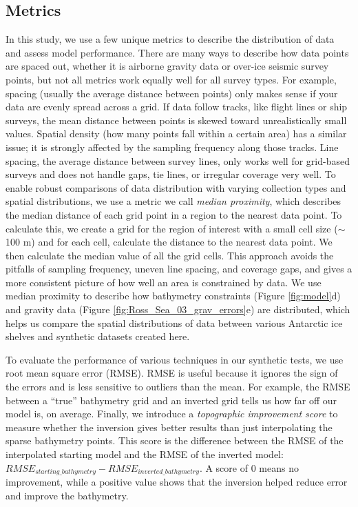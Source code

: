 \documentclass[tc, manuscript]{copernicus}
\begin{document}
\subsection{Metrics}
In this study, we use a few unique metrics to describe the distribution of data and assess model performance. There are many ways to describe how data points are spaced out, whether it is airborne gravity data or over-ice seismic survey points, but not all metrics work equally well for all survey types. For example, spacing (usually the average distance between points) only makes sense if your data are evenly spread across a grid. If data follow tracks, like flight lines or ship surveys, the mean distance between points is skewed toward unrealistically small values. Spatial density (how many points fall within a certain area) has a similar issue; it is strongly affected by the sampling frequency along those tracks. Line spacing, the average distance between survey lines, only works well for grid-based surveys and does not handle gaps, tie lines, or irregular coverage very well. To enable robust comparisons of data distribution with varying collection types and spatial distributions, we use a metric we call \textit{median proximity}, which describes the median distance of each grid point in a region to the nearest data point. To calculate this, we create a grid for the region of interest with a small cell size ($\sim$100 m) and for each cell, calculate the distance to the nearest data point. We then calculate the median value of all the grid cells.
This approach avoids the pitfalls of sampling frequency, uneven line spacing, and coverage gaps, and gives a more consistent picture of how well an area is constrained by data. We use median proximity to describe how bathymetry constraints (Figure \ref{fig:model}d) and gravity data (Figure \ref{fig:Ross_Sea_03_grav_errors}e) are distributed, which helps us compare the spatial distributions of data between various Antarctic ice shelves and synthetic datasets created here.

To evaluate the performance of various techniques in our synthetic tests, we use root mean square error (RMSE). RMSE is useful because it ignores the sign of the errors and is less sensitive to outliers than the mean. For example, the RMSE between a “true” bathymetry grid and an inverted grid tells us how far off our model is, on average. Finally, we introduce a \textit{topographic improvement score} to measure whether the inversion gives better results than just interpolating the sparse bathymetry points. This score is the difference between the RMSE of the interpolated starting model and the RMSE of the inverted model: $RMSE_{starting{\_} bathymetry} - RMSE_{inverted{\_} bathymetry}$. A score of 0 means no improvement, while a positive value shows that the inversion helped reduce error and improve the bathymetry.
\end{document}
